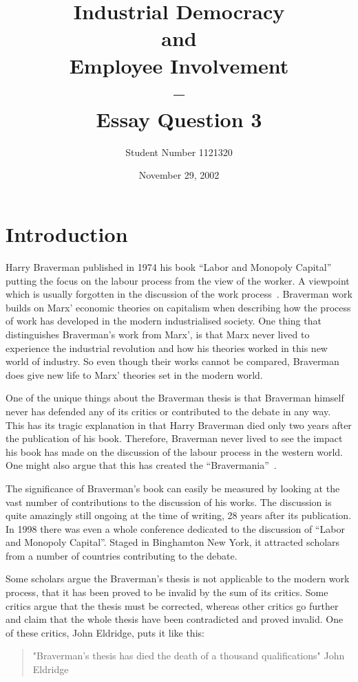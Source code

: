 \documentclass[a4paper,12pt,titlepage]{article}
\title{Industrial Democracy \\and \\Employee Involvement \\ -- \\Essay Question 3}
\author{Student Number 1121320}
\date{November 29, 2002}
\begin{document}
  \setlength{\baselineskip}{2em}
  \maketitle
  
  \section{Introduction}
  Harry Braverman published in 1974 his book
  ``Labor and Monopoly Capital'' putting the focus
  on the labour process from the view of the worker.
  A viewpoint which is usually forgotten in the discussion
  of the work process~\cite[9]{mnpb}. Braverman work builds on
  Marx' economic theories on capitalism when describing how
  the process of work has developed in the modern industrialised society.
  One thing that distinguishes Braverman's work from Marx', is that
  Marx never lived to experience the industrial revolution
  and how his theories worked in this new world of industry.
  So even though their works cannot be compared, 
  Braverman does give new life to Marx' theories set in the modern world.

  One of the unique things about the
  Braverman thesis is that Braverman himself never has defended any of
  its critics or contributed to the debate in any way.
  This has its tragic explanation in that
  Harry Braverman died only two years after the publication
  of his book. Therefore, Braverman never lived to see the
  impact his book has made on the discussion of the labour
  process in the western world. One might also argue that
  this has created the ``Bravermania''~\cite[40-41]{ptcs}.

  The significance of Braverman's book can easily be measured
  by looking at the vast number of contributions to the
  discussion of his works. The discussion is quite amazingly
  still ongoing at the time of writing, 28 years after its
  publication. In 1998 there was even a whole conference
  dedicated to the discussion of ``Labor and Monopoly Capital''.
  Staged in Binghamton New York, it attracted scholars from a
  number of countries contributing to the debate. 

  Some scholars argue the Braverman's thesis is not applicable
  to the modern work process, that it has been proved to be invalid
  by the sum of its critics. Some critics argue that the thesis
  must be corrected, whereas other critics go further and claim
  that the whole thesis have been contradicted and proved invalid.
  One of these critics, John Eldridge, puts it like this:
  \begin{quote}
    "Braverman's thesis has died the death of a thousand qualifications"
    John Eldridge
  \end{quote}
  
\end{document}
